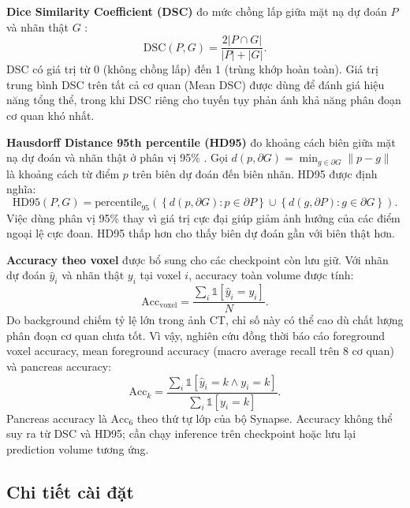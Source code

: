 \documentclass[10pt,a4paper]{article}
\begin{document}
\textbf{Dice Similarity Coefficient (DSC)} đo mức chồng lấp giữa mặt nạ dự đoán $P$ và nhãn thật $G$ \cite{taha2015metrics}:
\begin{equation}
    \text{DSC}(P,G) = \frac{2|P \cap G|}{|P| + |G|}.
\end{equation}
DSC có giá trị từ 0 (không chồng lấp) đến 1 (trùng khớp hoàn toàn). Giá trị trung bình DSC trên tất cả cơ quan (Mean DSC) được dùng để đánh giá hiệu năng tổng thể, trong khi DSC riêng cho tuyến tụy phản ánh khả năng phân đoạn cơ quan khó nhất.

\textbf{Hausdorff Distance 95th percentile (HD95)} đo khoảng cách biên giữa mặt nạ dự đoán và nhãn thật ở phân vị 95\% \cite{taha2015metrics}. Gọi $d(p, \partial G) = \min_{g \in \partial G} \|p - g\|$ là khoảng cách từ điểm $p$ trên biên dự đoán đến biên nhãn. HD95 được định nghĩa:
\begin{equation}
    \text{HD95}(P,G) = \text{percentile}_{95}\left(\left\{d(p, \partial G) : p \in \partial P\right\} \cup \left\{d(g, \partial P) : g \in \partial G\right\}\right).
\end{equation}
Việc dùng phân vị 95\% thay vì giá trị cực đại giúp giảm ảnh hưởng của các điểm ngoại lệ cực đoan. HD95 thấp hơn cho thấy biên dự đoán gần với biên thật hơn.

\textbf{Accuracy theo voxel} được bổ sung cho các checkpoint còn lưu giữ. Với nhãn dự đoán $\hat{y}_i$ và nhãn thật $y_i$ tại voxel $i$, accuracy toàn volume được tính:
\begin{equation}
    \text{Acc}_{\text{voxel}} = \frac{\sum_i \mathbb{1}[\hat{y}_i = y_i]}{N}.
\end{equation}
Do background chiếm tỷ lệ lớn trong ảnh CT, chỉ số này có thể cao dù chất lượng phân đoạn cơ quan chưa tốt. Vì vậy, nghiên cứu đồng thời báo cáo foreground voxel accuracy, mean foreground accuracy (macro average recall trên 8 cơ quan) và pancreas accuracy:
\begin{equation}
    \text{Acc}_{k} = \frac{\sum_i \mathbb{1}[\hat{y}_i = k \land y_i = k]}{\sum_i \mathbb{1}[y_i = k]}.
\end{equation}
Pancreas accuracy là $\text{Acc}_{6}$ theo thứ tự lớp của bộ Synapse. Accuracy không thể suy ra từ DSC và HD95; cần chạy inference trên checkpoint hoặc lưu lại prediction volume tương ứng.

\subsection{Chi tiết cài đặt}
\end{document}
